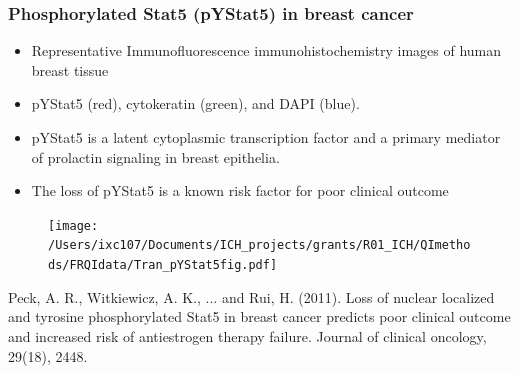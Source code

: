 \documentclass[t,8pt]{beamer}
\begin{document}
	\frame
	{\frametitle{Phosphorylated Stat5 (pYStat5) in breast cancer}   
		\begin{itemize}
			\item Representative Immunofluorescence immunohistochemistry images of human breast tissue 
			\item  pYStat5 (red), cytokeratin (green), and DAPI (blue).
                \item pYStat5 is a latent cytoplasmic transcription factor and a primary mediator of prolactin signaling in breast epithelia.
               \color{red}
                \item The loss of pYStat5 is a known risk factor for poor clinical outcome \cite{Peck11}
  		\end{itemize}              
	 \begin{figure}
                \texttt{[image: /Users/ixc107/Documents/ICH\_projects/grants/R01\_ICH/QImethods/FRQIdata/Tran\_pYStat5fig.pdf]}
	\end{figure} 
	\begin{thebibliography}{ }
\begin{small}
Peck, A. R., Witkiewicz, A. K., ... and Rui, H. (2011). 
Loss of nuclear localized and tyrosine phosphorylated Stat5 in breast cancer predicts poor clinical outcome and increased risk of antiestrogen therapy failure. Journal of clinical oncology, 29(18), 2448.
\end{small}
\end{thebibliography}	
	}
	
\end{document}
